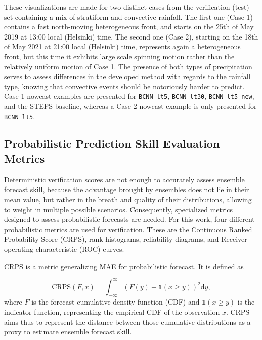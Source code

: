 These visualizations are made for two distinct cases from the verification (test) set containing a mix of stratiform and convective rainfall. The first one (Case 1) contains a fast north-moving heterogeneous front, and starts on the 25th of May 2019 at 13:00 local (Helsinki) time. The second one (Case 2), starting on the 18th of May 2021 at 21:00 local (Helsinki) time, represents again a heterogeneous front, but this time it exhibits large scale spinning motion rather than the relatively uniform motion of Case 1. The presence of both types of precipitation serves to assess differences in the developed method with regards to the rainfall type, knowing that convective events should be notoriously harder to predict. Case 1 nowcast examples are presented for \texttt{BCNN lt5}, \texttt{BCNN lt30}, \texttt{BCNN lt5 new}, and the STEPS baseline, whereas a Case 2 nowcast example is only presented for \texttt{BCNN lt5}.

\subsection{Probabilistic Prediction Skill Evaluation Metrics}

\label{section:prob_metric}
Deterministic verification scores are not enough to accurately assess ensemble forecast skill, because the advantage brought by ensembles does not lie in their mean value, but rather in the breath and quality of their distributions, allowing to weight in multiple possible scenarios. Consequently, specialized metrics designed to assess probabilistic forecasts are needed. 
For this work, four different probabilistic metrics are used for verification. These are the Continuous Ranked Probability Score (CRPS), rank histograms, reliability diagrams, and Receiver operating characteristic (ROC) curves. 

CRPS is a metric generalizing MAE for probabilistic forecast. It is defined as 

\begin{equation}
	\text{CRPS}(F,x) = \int_{-\infty}^{\infty} (F(y) - \mathds{1}(x \geq y))^2 \mathrm{d}y, 
\end{equation}
%
where $F$ is the forecast cumulative density function (CDF) and $\mathds{1}(x \geq y)$ is the indicator function, representing the empirical CDF of the observation $x$. CRPS aims thus to represent the distance between those cumulative distributions as a proxy to estimate ensemble forecast skill. 

